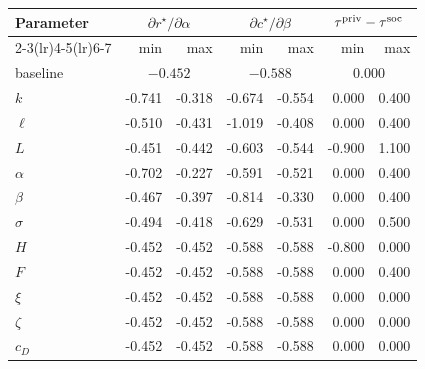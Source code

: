 \begin{tabular}{lrrrrrr}
\toprule
Parameter & \multicolumn{2}{c}{$\partial r^\star/\partial\alpha$} & \multicolumn{2}{c}{$\partial c^\star/\partial\beta$} & \multicolumn{2}{c}{$\tau^{\rm priv}-\tau^{\rm soc}$} \\
\cmidrule(lr){2-3}\cmidrule(lr){4-5}\cmidrule(lr){6-7}
 & min & max & min & max & min & max \\
\midrule
baseline & \multicolumn{2}{c}{$-0.452$} & \multicolumn{2}{c}{$-0.588$} & \multicolumn{2}{c}{$0.000$} \\
\midrule
$k$ & -0.741 & -0.318 & -0.674 & -0.554 & 0.000 & 0.400 \\
$\ell$ & -0.510 & -0.431 & -1.019 & -0.408 & 0.000 & 0.400 \\
$L$ & -0.451 & -0.442 & -0.603 & -0.544 & -0.900 & 1.100 \\
$\alpha$ & -0.702 & -0.227 & -0.591 & -0.521 & 0.000 & 0.400 \\
$\beta$ & -0.467 & -0.397 & -0.814 & -0.330 & 0.000 & 0.400 \\
$\sigma$ & -0.494 & -0.418 & -0.629 & -0.531 & 0.000 & 0.500 \\
$H$ & -0.452 & -0.452 & -0.588 & -0.588 & -0.800 & 0.000 \\
$F$ & -0.452 & -0.452 & -0.588 & -0.588 & 0.000 & 0.400 \\
$\xi$ & -0.452 & -0.452 & -0.588 & -0.588 & 0.000 & 0.000 \\
$\zeta$ & -0.452 & -0.452 & -0.588 & -0.588 & 0.000 & 0.000 \\
$c_D$ & -0.452 & -0.452 & -0.588 & -0.588 & 0.000 & 0.000 \\
\bottomrule
\end{tabular}